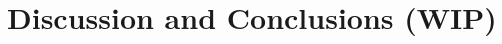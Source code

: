 \documentclass[11pt]{article}
\begin{document}
\lipsum[12-13] %

\section{Discussion and Conclusions (WIP)}

\lipsum[14] %

\medskip

 

\newpage

\end{document}
